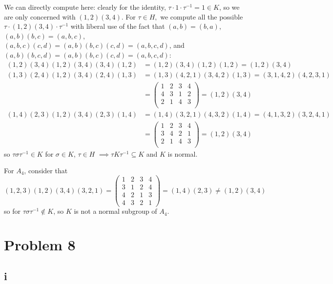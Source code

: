 \documentclass[12pt,letterpaper]{article}
\theoremstyle{definition}
\begin{document}
We can directly compute here: clearly for the identity, $\tau \cdot 1 \cdot \tau^{-1} = 1 \in K$, so we are only concerned with $(1,2)(3,4)$. For $\tau \in H,$ we compute all the possible $\tau \cdot (1,2)(3,4) \cdot \tau^{-1}$ with liberal use of the fact that $(a,b) = (b,a)$, $(a,b)(b,c) = (a,b,c)$, $(a,b,c)(c,d) = (a,b)(b,c)(c,d) = (a,b,c,d)$, and $(a,b)(b,c,d) = (a,b)(b,c)(c,d) = (a,b,c,d)$:
\begin{align*}
  (1,2)(3,4)(1,2)(3,4)(3,4)(1,2) &= (1,2)(3,4)(1,2)(1,2) = (1,2)(3,4) \\
  (1,3)(2,4)(1,2)(3,4)(2,4)(1,3) &= (1,3)(4,2,1)(3,4,2)(1,3) = (3,1,4,2)(4,2,3,1)\\
                                 &=
  \begin{pmatrix}
    1 & 2 & 3 & 4 \\
    4 & 3 & 1 & 2 \\
    2 & 1 & 4 & 3 \\
  \end{pmatrix} = (1,2)(3,4) \\
  (1,4)(2,3)(1,2)(3,4)(2,3)(1,4) &= (1,4)(3,2,1)(4,3,2)(1,4) = (4,1,3,2)(3,2,4,1) \\
                                 &=
  \begin{pmatrix}
    1 & 2 & 3 & 4 \\
    3 & 4 & 2 & 1 \\
    2 & 1 & 4 & 3 \\
  \end{pmatrix} = (1,2)(3,4)
\end{align*}
so $\tau \sigma \tau^{-1} \in K$ for $\sigma \in K$, $\tau \in H$ $\implies \tau K \tau^{-1} \subseteq K$ and $K$ is normal.

For $A_{4}$, consider that
\[
  (1,2,3)(1,2)(3,4)(3,2,1) = \begin{pmatrix}
    1 & 2 & 3 & 4 \\
    3 & 1 & 2 & 4 \\
    4 & 2 & 1 & 3 \\
    4 & 3 & 2 & 1
  \end{pmatrix} = (1,4)(2,3) \neq (1,2)(3,4)
\]
so for $\tau \sigma \tau^{-1} \notin K$, so $K$ is not a normal subgroup of $A_{4}$.

\section*{Problem 8}

\subsection*{i}
\end{document}
